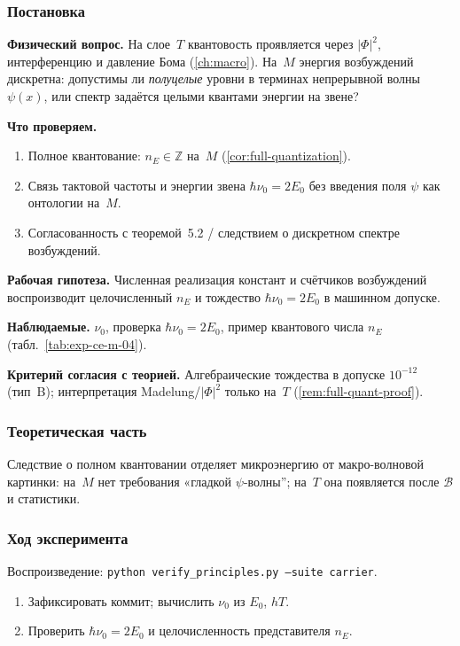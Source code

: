 \label{exp:cem04}

\subsubsection*{Постановка}
\textbf{Физический вопрос.}
На слое~$T$ квантовость проявляется через $|\Phi|^2$, интерференцию и давление Бома (\cref{ch:macro}).
На~$M$ энергия возбуждений дискретна: допустимы ли \emph{полуцелые} уровни в терминах непрерывной волны $\psi(x)$, или спектр задаётся целыми квантами энергии на звене?

\textbf{Что проверяем.}
\begin{enumerate}[label=\textbf{(\alph*)},leftmargin=*,itemsep=0.25em]
\item Полное квантование: $n_E\in\mathbb{Z}$ на~$M$ (\cref{cor:full-quantization}).
\item Связь тактовой частоты и энергии звена $\hbar\nu_0=2E_0$ без введения поля $\psi$ как онтологии на~$M$.
\item Согласованность с теоремой~5.2 / следствием о дискретном спектре возбуждений.
\end{enumerate}

\textbf{Рабочая гипотеза.}
Численная реализация констант и счётчиков возбуждений воспроизводит целочисленный $n_E$ и тождество $\hbar\nu_0=2E_0$ в машинном допуске.

\textbf{Наблюдаемые.}
$\nu_0$, проверка $\hbar\nu_0=2E_0$, пример квантового числа $n_E$ (табл.~\ref{tab:exp-ce-m-04}).

\textbf{Критерий согласия с теорией.}
Алгебраические тождества в допуске $10^{-12}$ (тип~B); интерпретация Madelung/$|\Phi|^2$ только на~$T$ (\cref{rem:full-quant-proof}).

\subsubsection*{Теоретическая часть}
Следствие о полном квантовании отделяет микроэнергию от макро-волновой картинки: на~$M$ нет требования «гладкой $\psi$-волны''; на~$T$ она появляется после $\mathcal{B}$ и статистики.

\subsubsection*{Ход эксперимента}
Воспроизведение: \texttt{python verify\_principles.py --suite carrier}.

\begin{enumerate}[label=\textbf{Шаг \arabic*:},leftmargin=*,itemsep=0.35em]
\item Зафиксировать коммит; вычислить $\nu_0$ из $E_0$, $hT$.
\item Проверить $\hbar\nu_0=2E_0$ и целочисленность представителя $n_E$.
\end{enumerate}

